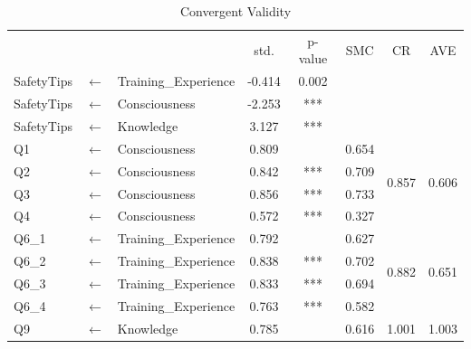 \begin{table}[h]
  \caption{Convergent Validity}
  \label{table35}
  \centering
  \begin{tabular}{lcl|cc|ccc}
  \hline
   & & & std.   & p-value           & SMC                  & CR                     & AVE                    \\
SafetyTips           & $\longleftarrow$       & Training\_Experience & -0.414 & 0.002                & \multicolumn{3}{l}{}    \\
SafetyTips           & $\longleftarrow$       & Consciousness        & -2.253 & ***                  & \multicolumn{3}{l}{} \\
SafetyTips           & $\longleftarrow$       & Knowledge            & 3.127  & ***                  & \multicolumn{3}{l}{}   \\
\hline
Q1                   & $\longleftarrow$       & Consciousness        & 0.809  &  & 0.654                & \multirow{4}{*}{0.857} & \multirow{4}{*}{0.606} \\
Q2                   & $\longleftarrow$       & Consciousness        & 0.842  & ***                  & 0.709                &                        &                        \\
Q3                   & $\longleftarrow$       & Consciousness        & 0.856  & ***                  & 0.733                &                        &                        \\
Q4                   & $\longleftarrow$       & Consciousness        & 0.572  & ***                  & 0.327                &                        &                        \\
Q6\_1                & $\longleftarrow$       & Training\_Experience & 0.792  &  & 0.627                & \multirow{4}{*}{0.882} & \multirow{4}{*}{0.651} \\
\hline
Q6\_2                & $\longleftarrow$       & Training\_Experience & 0.838  & ***                  & 0.702                &                        &                        \\
Q6\_3                & $\longleftarrow$       & Training\_Experience & 0.833  & ***                  & 0.694                &                        &                        \\
Q6\_4                & $\longleftarrow$       & Training\_Experience & 0.763  & ***                  & 0.582                &                        &                        \\
Q9                   & $\longleftarrow$       & Knowledge            & 0.785  &  & 0.616                & \multirow{2}{*}{1.001} & \multirow{2}{*}{1.003} \\

\end{tabular}
\end{table}
